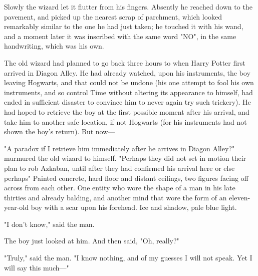Slowly the wizard let it flutter from his fingers. Absently he reached down to
the pavement, and picked up the nearest scrap of parchment, which looked
remarkably similar to the one he had just taken; he touched it with his wand,
and a moment later it was inscribed with the same word "NO", in the same
handwriting, which was his own.

The old wizard had planned to go back three hours to when Harry Potter first
arrived in Diagon Alley. He had already watched, upon his instruments, the boy
leaving Hogwarts, and that could not be undone (his one attempt to fool his own
instruments, and so control Time without altering its appearance to himself,
had ended in sufficient disaster to convince him to never again try such
trickery). He had hoped to retrieve the boy at the first possible moment after
his arrival, and take him to another safe location, if not Hogwarts (for his
instruments had not shown the boy's return). But now---

"A paradox if I retrieve him immediately after he arrives in Diagon Alley?"
murmured the old wizard to himself. "Perhaps they did not set in motion their
plan to rob Azkaban, until after they had confirmed his arrival here{\el} or
else{\el} perhaps{\el}"
\sbreak
Painted concrete, hard floor and distant ceilings, two figures facing off
across from each other. One entity who wore the shape of a man in his late
thirties and already balding, and another mind that wore the form of an
eleven-year-old boy with a scar upon his forehead. Ice and shadow, pale blue
light.

"I don't know," said the man.

The boy just looked at him. And then said, "Oh, really?"

"Truly," said the man. "I know nothing, and of my guesses I will not speak. Yet
I will say this much\mbox{---}"
